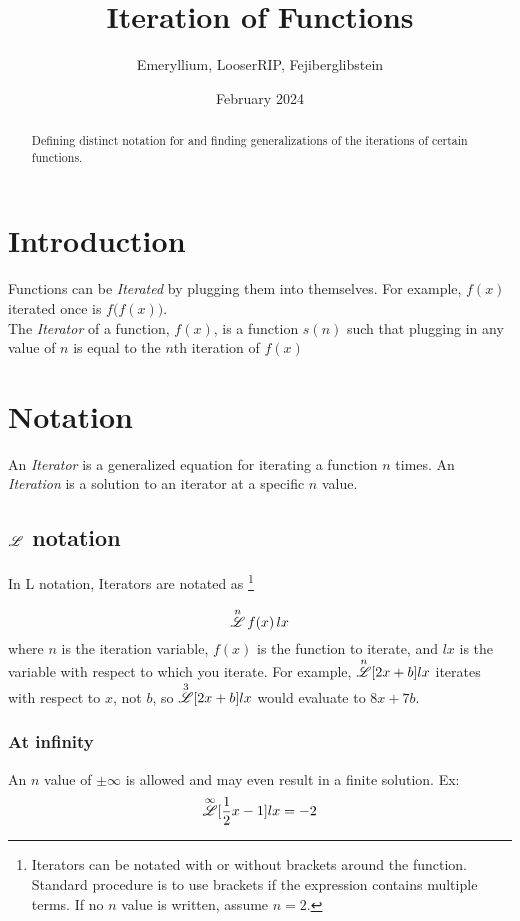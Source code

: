 \documentclass[12pt, letterpaper]{article}
\title{Iteration of Functions}
\author{Emeryllium, LooserRIP, Fejiberglibstein}
\date{February 2024}
\begin{document}
\maketitle

\begin{abstract}
    Defining distinct notation for and finding generalizations of the iterations of certain functions.
\end{abstract}

\tableofcontents
\newpage

\section{Introduction}
Functions can be \textit{Iterated} by plugging them into themselves. For example, $f(x)$ iterated once is $f\big(f(x)\big)$. 
\\
The \textit{Iterator} of a function, $f(x)$, is a function $s(n)$ such that plugging in any value of $n$ is equal to the $n$th iteration of $f(x)$


\section{Notation}

An \textit{Iterator} is a generalized equation for iterating a function $n$ times.
An \textit{Iteration} is a solution to an iterator at a specific $n$ value.

\subsection{$\overset{}{\mathscr{L}}$ notation}
In L notation, Iterators are notated as
    \footnote{Iterators can be notated with or without brackets around the function. Standard procedure is to use brackets if the expression contains multiple terms. If no $n$ value is written, assume $n=2$.}

$$ \overset{n}{\mathscr{L}} \, f(x) \, lx$$
where $n$ is the iteration variable, $f(x)$ is the function to iterate, and $lx$ is the variable with respect to which you iterate. For example, $\overset{n}{\mathscr{L}} [2x+b] lx$
iterates with respect to $x$, not $b$, so $\overset{3}{\mathscr{L}} [2x+b] lx$ would evaluate to $8x+7b$.

\subsubsection{At infinity}
An $n$ value of $\pm\infty$ is allowed and may even result in a finite solution. Ex:
$$\overset{\infty}{\mathscr{L}} [\frac{1}{2}x - 1] lx = -2$$
\end{document}
